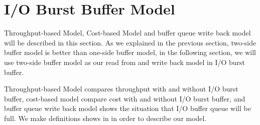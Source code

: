 \section{I/O Burst Buffer Model}
\label{sec:model}


Throughput-based Model, Cost-based Model and buffer queue write back model will be described in this section.
As we explained in the previous section, two-side buffer model is better than one-side buffer model, in the following section, we will use two-side buffer model as our read from and write back model in I/O burst buffer.

Throughput-based Model compares throughput with and without I/O burst buffer, cost-based model compare cost with and without I/O burst buffer, and buffer queue write back model shows the situation that I/O buffer queue will be full. 
We make definitions shows in  in order to describe our model.
